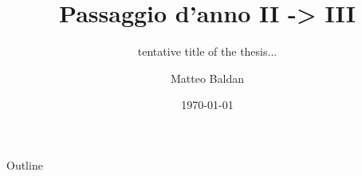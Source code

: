 \documentclass{beamer}
\title{Passaggio d'anno II -> III}
\subtitle{tentative title of the thesis...}
\author{Matteo Baldan}
\date{\today}
\begin{document}
    \begin{emptyframe}
        \titlepage
    \end{emptyframe}

    \begin{frame}{Outline}
        \tableofcontents
    \end{frame}

    
\end{document}
